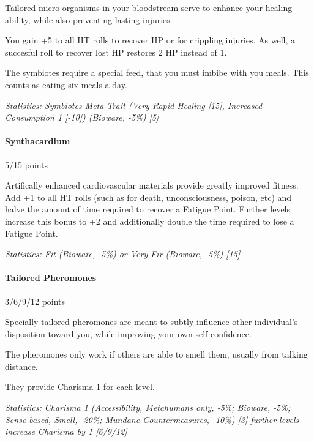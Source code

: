 \begin{multicols*}{3}
	Tailored micro-organisms in your bloodstream serve to enhance your healing ability, while also preventing lasting injuries.
	
	You gain +5 to all HT rolls to recover HP or for crippling injuries. As well, a succesful roll to recover lost HP restores 2 HP instead of 1.
	
	The symbiotes require a special feed, that you must imbibe with you meals. This counts as eating six meals a day.
	
	\textit{\textcolor{OliveGreen}{Statistics: Symbiotes Meta-Trait (Very Rapid Healing [15], Increased Consumption 1 [-10]) (Bioware, -5\%) [5]}}
	
	\paragraph{Synthacardium}
	\begin{flushright}
		5/15 points
	\end{flushright}

	Artifically enhanced cardiovascular materials provide greatly improved fitness. Add +1 to all HT rolls (such as for death, unconsciousness, poison, etc) and halve the amount of time required to recover a Fatigue Point. Further levels increase this bonus to +2 and additionally double the time required to lose a Fatigue Point.
	
	\textit{\textcolor{OliveGreen}{Statistics: Fit (Bioware, -5\%) or Very Fir (Bioware, -5\%) [15]}}
	
	\paragraph{Tailored Pheromones}
	\begin{flushright}
		3/6/9/12 points
	\end{flushright}
	
	Specially tailored pheromones are meant to subtly influence other individual's disposition toward you, while improving your own self confidence. 
	
	The pheromones only work if others are able to smell them, usually from talking distance. 
	
	They provide Charisma 1 for each level.
	
	\textit{\textcolor{OliveGreen}{Statistics: Charisma 1 (Accessibility, Metahumans only, -5\%; Bioware, -5\%; Sense based, Smell, -20\%; Mundane Countermeasures, -10\%) [3] further levels increase Charisma by 1 [6/9/12]}}
	

\end{multicols*}
